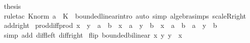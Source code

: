 \begin{isabellebody}
\ {\isacharquery}{\kern0pt}thesis\isanewline
\ \ \ \ \isamarkupfalse%
\ {\isacharparenleft}{\kern0pt}rule{\isacharunderscore}{\kern0pt}tac\ K{\isacharequal}{\kern0pt}{\isachardoublequoteopen}norm\ a\ {\isacharasterisk}{\kern0pt}\ K{\isachardoublequoteclose}\ \ bounded{\isacharunderscore}{\kern0pt}linear{\isacharunderscore}{\kern0pt}intro{\isacharparenright}{\kern0pt}\ {\isacharparenleft}{\kern0pt}auto\ simp{\isacharcolon}{\kern0pt}\ algebra{\isacharunderscore}{\kern0pt}simps\ scaleR{\isacharunderscore}{\kern0pt}right\ add{\isacharunderscore}{\kern0pt}right{\isacharparenright}{\kern0pt}\isanewline
{}\isamarkupfalse%
%
\endisatagproof
{\isafoldproof}%
%
\isadelimproof
\isanewline
%
\endisadelimproof
\isanewline
{}\isamarkupfalse%
\ prod{\isacharunderscore}{\kern0pt}diff{\isacharunderscore}{\kern0pt}prod{\isacharcolon}{\kern0pt}\ {\isachardoublequoteopen}{\isacharparenleft}{\kern0pt}x\ {\isacharasterisk}{\kern0pt}{\isacharasterisk}{\kern0pt}\ y\ {\isacharminus}{\kern0pt}\ a\ {\isacharasterisk}{\kern0pt}{\isacharasterisk}{\kern0pt}\ b{\isacharparenright}{\kern0pt}\ {\isacharequal}{\kern0pt}\ {\isacharparenleft}{\kern0pt}x\ {\isacharminus}{\kern0pt}\ a{\isacharparenright}{\kern0pt}\ {\isacharasterisk}{\kern0pt}{\isacharasterisk}{\kern0pt}\ {\isacharparenleft}{\kern0pt}y\ {\isacharminus}{\kern0pt}\ b{\isacharparenright}{\kern0pt}\ {\isacharplus}{\kern0pt}\ {\isacharparenleft}{\kern0pt}x\ {\isacharminus}{\kern0pt}\ a{\isacharparenright}{\kern0pt}\ {\isacharasterisk}{\kern0pt}{\isacharasterisk}{\kern0pt}\ b\ {\isacharplus}{\kern0pt}\ a\ {\isacharasterisk}{\kern0pt}{\isacharasterisk}{\kern0pt}\ {\isacharparenleft}{\kern0pt}y\ {\isacharminus}{\kern0pt}\ b{\isacharparenright}{\kern0pt}{\isachardoublequoteclose}\isanewline
%
\isadelimproof
\ \ %
\endisadelimproof
%
\isatagproof
{}\isamarkupfalse%
\ {\isacharparenleft}{\kern0pt}simp\ add{\isacharcolon}{\kern0pt}\ diff{\isacharunderscore}{\kern0pt}left\ diff{\isacharunderscore}{\kern0pt}right{\isacharparenright}{\kern0pt}%
\endisatagproof
{\isafoldproof}%
%
\isadelimproof
\isanewline
%
\endisadelimproof
\isanewline
{}\isamarkupfalse%
\ flip{\isacharcolon}{\kern0pt}\ {\isachardoublequoteopen}bounded{\isacharunderscore}{\kern0pt}bilinear\ {\isacharparenleft}{\kern0pt}{\isasymlambda}x\ y{\isachardot}{\kern0pt}\ y\ {\isacharasterisk}{\kern0pt}{\isacharasterisk}{\kern0pt}\ x{\isacharparenright}{\kern0pt}{\isachardoublequoteclose}\isanewline
%
\isadelimproof
%
\endisadelimproof
%
\isatagproof
{}\isamarkupfalse%
\isanewline

\end{isabellebody}
